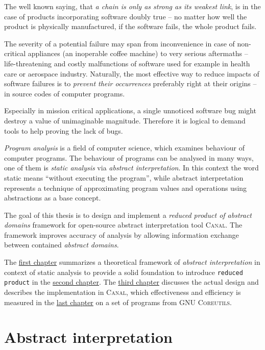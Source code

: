 \documentclass[12pt,oneside]{fithesis2}
\theoremstyle{definition}
\begin{document}
The well known saying, that \textit{a chain is only as strong as its weakest link}, is in the case of products incorporating software doubly true -- no matter how well the product is physically manufactured, if the software fails, the whole product fails.

The severity of a potential failure may span from inconvenience in case of non-critical appliances (an inoperable coffee machine) to very serious aftermaths -- life-threatening and costly malfunctions of software used for example in health care or aerospace industry. Naturally, the most effective way to reduce impacts of software failures is to \textit{prevent their occurrences} preferably right at their origins -- in source codes of computer programs.

Especially in mission critical applications, a single unnoticed software bug might destroy a value of unimaginable magnitude. Therefore it is logical to demand tools to help proving the lack of bugs.

\textit{Program analysis} is a field of computer science, which examines behaviour of computer programs. The behaviour of programs can be analysed in many ways, one of them is \textit{static analysis} via \textit{abstract interpretation}. In this context the word static means ``without executing the program'', while abstract interpretation represents a technique of approximating program values and operations using abstractions as a base concept.

The goal of this thesis is to design and implement a \textit{reduced product of abstract domains} framework for open-source abstract interpretation tool \textsc{Canal}. The framework improves accuracy of analysis by allowing information exchange between contained \textit{abstract domains}.

The \hyperref[ch:abstract-interpretation]{first chapter} summarizes a theoretical framework of \textit{abstract interpretation} in context of static analysis to provide a solid foundation to introduce \texttt{reduced product} in the \hyperref[ch:reduced-product]{second chapter}. The \hyperref[ch:implementation]{third chapter} discusses the actual design and describes the implementation in \textsc{Canal}, which effectiveness and efficiency is measured in the \hyperref[ch:measurements]{last chapter} on a set of programs from \textsc{GNU Coreutils}.

\chapter{Abstract interpretation}\label{ch:abstract-interpretation}
\end{document}
